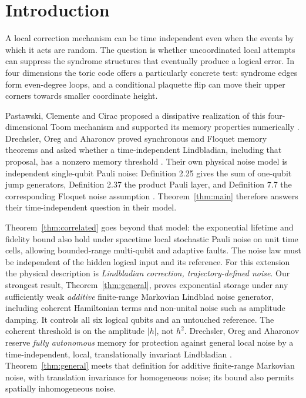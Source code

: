 \section{Introduction}\label{sec:intro}

A local correction mechanism can be time independent even when the
events by which it acts are random. The question is whether
uncoordinated local attempts can suppress the syndrome structures that
eventually produce a logical error. In four dimensions the toric code
offers a particularly concrete test: syndrome edges form even-degree
loops, and a conditional plaquette flip can move their upper corners
towards smaller coordinate height.

Pastawski, Clemente and Cirac proposed a dissipative realization of this
four-dimensional Toom mechanism and supported its memory properties
numerically \cite{PCC}. Drechsler, Oreg and Aharonov proved synchronous
and Floquet memory theorems and asked whether a time-independent
Lindbladian, including that proposal, has a nonzero memory threshold
\cite[Sections 1.5.3 and 1.8]{DOA}. Their own physical noise model is
independent single-qubit Pauli noise: Definition 2.25 gives the sum of
one-qubit jump generators, Definition 2.37 the product Pauli layer, and
Definition 7.7 the corresponding Floquet noise assumption
\cite{DOA}. Theorem~\ref{thm:main} therefore answers their
time-independent question in their model.

Theorem~\ref{thm:correlated} goes beyond that model: the exponential
lifetime and fidelity bound also hold under spacetime local stochastic
Pauli noise on unit time cells, allowing bounded-range multi-qubit and
adaptive faults. The noise law must be independent of the hidden
logical input and its reference. For this extension the physical
description is \emph{Lindbladian correction, trajectory-defined noise}.
Our strongest result, Theorem~\ref{thm:general}, proves exponential
storage under any sufficiently weak \emph{additive} finite-range
Markovian Lindblad noise generator, including coherent Hamiltonian
terms and non-unital noise such as amplitude damping.
It controls all six logical qubits and an untouched reference.
The coherent threshold is on the amplitude \(|h|\), not \(h^2\).
Drechsler, Oreg and Aharonov reserve \emph{fully autonomous} memory for
protection against general local noise by a time-independent, local,
translationally invariant Lindbladian
\cite[Section 1.5.1, Table 1]{DOA}.
Theorem~\ref{thm:general} meets that definition for additive finite-range
Markovian noise, with translation invariance for homogeneous noise;
its bound also permits spatially inhomogeneous noise.

